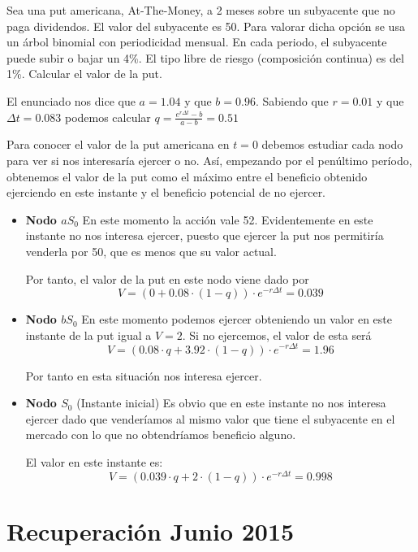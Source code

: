 \begin{problem}[4]
Sea una put americana, At-The-Money, a 2 meses sobre un subyacente que no paga dividendos. El valor del subyacente es 50. Para valorar dicha opción se usa un árbol binomial con periodicidad mensual. En cada periodo, el subyacente puede subir o bajar un 4\%. El tipo libre de riesgo (composición continua) es del 1\%. Calcular el valor de la put.
\solution


El enunciado nos dice que $a=1.04$ y que $b=0.96$. Sabiendo que $r=0.01$ y que $Δt=0.083$ podemos calcular $q=\frac{e^{rΔt}-b}{a-b}=0.51$

Para conocer el valor de la put americana en $t=0$ debemos estudiar cada nodo para ver si nos interesaría ejercer o no. Así, empezando por el penúltimo período, obtenemos el valor de la put como el máximo entre el beneficio obtenido ejerciendo en este instante y el beneficio potencial de no ejercer.

\begin{itemize}
\item \textbf{Nodo $aS_0$}
En este momento la acción vale 52. Evidentemente en este instante no nos interesa ejercer, puesto que ejercer la put nos permitiría venderla por 50, que es menos que su valor actual.

Por tanto, el valor de la put en este nodo viene dado por
\[V = \left(0 + 0.08 \cdot (1-q)\right)\cdot e^{-rΔt} = 0.039\]

\item \textbf{Nodo $bS_0$}
En este momento podemos ejercer obteniendo un valor en este instante de la put igual a $V=2$. Si no ejercemos, el valor de esta será
\[V = \left(0.08 \cdot q + 3.92 \cdot (1-q) \right)\cdot e^{-rΔt} = 1.96\]

Por tanto en esta situación nos interesa ejercer.

\item \textbf{Nodo $S_0$} (Instante inicial)
Es obvio que en este instante no nos interesa ejercer dado que venderíamos al mismo valor que tiene el subyacente en el mercado con lo que no obtendríamos beneficio alguno.

El valor en este instante es:
\[V = \left( 0.039 \cdot q + 2 \cdot (1-q)\right)\cdot e^{-rΔt} = 0.998\]
\end{itemize}

\end{problem}

\section{Recuperación Junio 2015}

